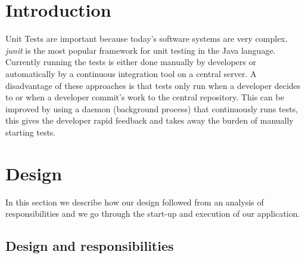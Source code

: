 \documentclass[i2]{oss}
\begin{document}

\maketitlepage
\newpage
\tableofcontents
\pagebreak




\section*{Introduction}
\label{ssec:introduction}
Unit Tests are important because today's software systems are very 
complex.
\emph{junit} is the most popular framework for unit testing in the Java 
language.
Currently running the tests is either done manually by developers or
automatically by a continuous integration tool on a central server.
A disadvantage of these approaches is that tests only run when a 
developer decides to or when a developer commit's work to the central 
repository.
This can be improved by using a daemon (background process) that continuously runs tests, this gives the developer rapid feedback and 
takes away the burden of manually starting tests.




\section{Design}
\label{ssec:design}

In this section we describe how our design followed from an analysis
of responsibilities and we go through the start-up and execution of 
our application.

\subsection{Design and responsibilities}
\end{document}
